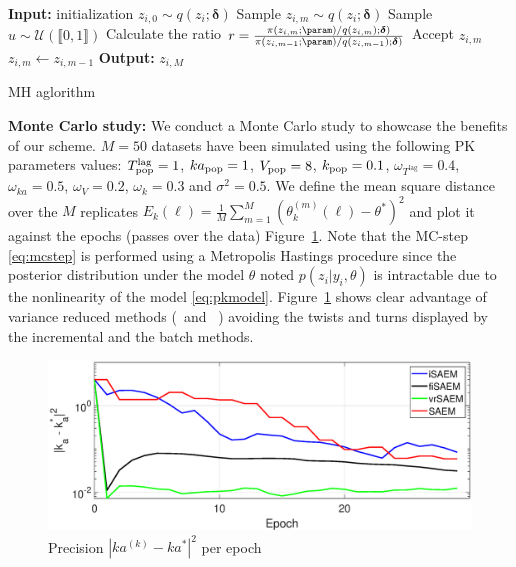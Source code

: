 \documentclass[11pt]{article}
\theoremstyle{t}
\begin{document}
\begin{algorithm}[H]
\begin{algorithmic}[1]
\STATE \textbf{Input:} initialization $z_{i,0} \sim q(z_{i}; {\bm \delta})$
\STATE Sample $z_{i,m} \sim q(z_{i}; {\bm \delta})$
\STATE Sample $u \sim \mathcal{U}(\llbracket 0, 1 \rrbracket)$
\STATE Calculate the ratio $r = \frac{\pi(z_{i,m}; \param)/q(z_{i,m}); {\bm \delta})}{\pi(z_{i,m-1}; \param)/q(z_{i,m-1}); {\bm \delta})}$
\STATE Accept $z_{i,m}$
\ELSE
\STATE $z_{i,m} \leftarrow z_{i,m-1}$
\ENDIF
\ENDFOR
\STATE \textbf{Output:} $z_{i,M}$
\end{algorithmic}
\caption{MH aglorithm}
\label{alg:mh}
        \end{algorithm}
        

\textbf{Monte Carlo study:}
We conduct a Monte Carlo study to showcase the benefits of our scheme.
$M=50$ datasets have been simulated using the following PK parameters values:
$T^{\textrm{lag}}_{\rm pop} =1$, $ka_{\rm pop} =1$, $V_{\rm pop}= 8$, $k_{\rm pop}=0.1$, $ \omega_{T^{\textrm{lag}}}=0.4$, $\omega_{ka}=0.5$, $\omega_{V}=0.2$, $\omega_{k}=0.3$ and $\sigma^2=0.5$.
We define the mean square distance over the $M$ replicates $E_k(\ell) = \frac{1}{M}\sum_{m=1}^{M}{\left(\theta_k^{(m)}(\ell) - \theta^* \right)^2}$ and plot it against the epochs (passes over the data) Figure~\ref{fig:pk_tts}.	
Note that the {\sf MC-step} \eqref{eq:mcstep} is performed using a Metropolis Hastings procedure since the posterior distribution under the model $\theta$ noted $p(z_i | y_i, \theta)$ is intractable due to the nonlinearity of the model \eqref{eq:pkmodel}.
Figure~\ref{fig:pk_tts} shows clear advantage of variance reduced methods (\SAEMVR\ and \FISAEM\ ) avoiding the twists and turns displayed by the incremental and the batch methods.


\begin{figure}[H]
\centering
\includegraphics[width=1.1\textwidth]{fig/figpk.eps}\vspace{-.2cm}
\caption{Precision $|ka^{(k)} - ka^*|^2$ per epoch}\vspace{-.2cm}
\label{fig:pk_tts}
\end{figure}
\end{document}
